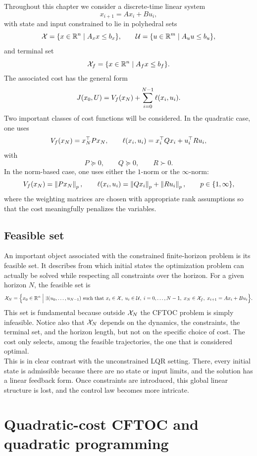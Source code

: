 Throughout this chapter we consider a discrete-time linear system
\[
x_{i+1}=Ax_i+Bu_i,
\]
with state and input constrained to lie in polyhedral sets
\[
\mathcal{X}=\{x\in\mathbb{R}^n\mid A_xx\le b_x\},
\qquad
\mathcal{U}=\{u\in\mathbb{R}^m\mid A_uu\le b_u\},
\]
and terminal set
\[
\mathcal{X}_f=\{x\in\mathbb{R}^n\mid A_fx\le b_f\}.
\]
The associated cost has the general form
\[
J(x_0,U)=V_f(x_N)+\sum_{i=0}^{N-1}\ell(x_i,u_i).
\]
Two important classes of cost functions will be considered. In the quadratic case, one uses
\[
V_f(x_N)=x_N^\top P x_N,
\qquad
\ell(x_i,u_i)=x_i^\top Q x_i+u_i^\top R u_i,
\]
with
\[
P\succeq 0,\qquad Q\succeq 0,\qquad R\succ 0.
\]
In the norm-based case, one uses either the \(1\)-norm or the \(\infty\)-norm:
\[
V_f(x_N)=\left\lVert P x_N \right\rVert_p,
\qquad
\ell(x_i,u_i)=\left\lVert Qx_i \right\rVert_p+\left\lVert Ru_i \right\rVert_p,
\qquad p\in\{1,\infty\},
\]
where the weighting matrices are chosen with appropriate rank assumptions so that the cost
meaningfully penalizes the variables.

\subsection{Feasible set}

An important object associated with the constrained finite-horizon problem is its feasible set.
It describes from which initial states the optimization problem can actually be solved while
respecting all constraints over the horizon. For a given horizon \(N\), the feasible set is
\[
\mathcal{X}_N
=
\Bigl\{
x_0\in\mathbb{R}^n\;\Big|\;
\exists (u_0,\dots,u_{N-1}) \text{ such that }
x_i\in\mathcal{X},\;
u_i\in\mathcal{U},\;
i=0,\dots,N-1,
\;
x_N\in\mathcal{X}_f,
\;
x_{i+1}=Ax_i+Bu_i
\Bigr\}.
\]
This set is fundamental because outside \(\mathcal{X}_N\) the CFTOC problem is simply infeasible.
Notice also that \(\mathcal{X}_N\) depends on the dynamics, the constraints, the terminal set, and the
horizon length, but not on the specific choice of cost. The cost only selects, among the feasible
trajectories, the one that is considered optimal.\\
This is in clear contrast with the unconstrained LQR setting. There, every initial state is
admissible because there are no state or input limits, and the solution has a linear feedback form.
Once constraints are introduced, this global linear structure is lost, and the control law becomes
more intricate.

\section{Quadratic-cost CFTOC and quadratic programming}


